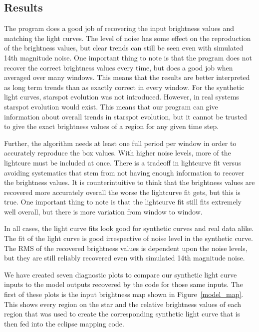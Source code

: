 

\subsection{Results \label{results}}
The program does a good job of recovering the input brightness values and matching the light curves. The level of noise has some effect on the reproduction of the brightness values, but clear trends can still be seen even with simulated 14th magnitude noise. One important thing to note is that the program does not recover the correct brightness values every time, but does a good job when averaged over many windows. This means that the results are better interpreted as long term trends than as exactly correct in every window. For the synthetic light curves, starspot evolution was not introduced. However, in real systems starspot evolution would exist. This means that our program can give information about overall trends in starspot evolution, but it cannot be trusted to give the exact brightness values of a region for any given time step. 

Further, the algorithm needs at least one full period per window in order to accurately reproduce the box values. With higher noise levels, more of the lightcure must be included at once. There is a tradeoff in lightcurve fit versus avoiding systematics that stem from not having enough information to recover the brightness values. It is counterintuitive to think that the brightness values are recovered more accurately overall the worse the lightcurve fit gets, but this is true. One important thing to note is that the lightcurve fit still fits extremely well overall, but there is more variation from window to window.

In all cases, the light curve fits look good for synthetic curves and real data alike. The fit of the light curve is good irrespective of noise level in the synthetic curve. The RMS of the recovered brightness values is dependent upon the noise levels, but they are still reliably recovered even with simulated 14th magnitude noise.

We have created seven diagnostic plots to compare our synthetic light curve inputs to the model outputs recovered by the code for those same inputs. The first of these plots is the input brightness map shown in Figure~\ref{model_map}. This shows every region on the star and the relative brightness values of each region that was used to create the corresponding synthetic light curve that is then fed into the eclipse mapping code.

